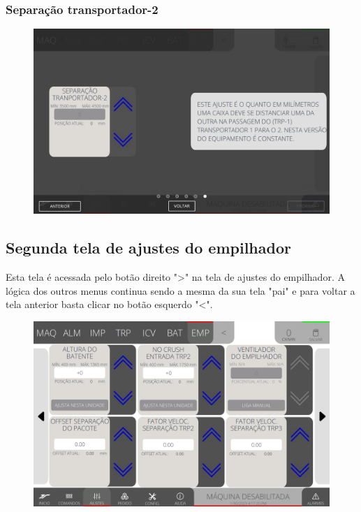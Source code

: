 \newpage
\thispagestyle{fancy}
\vspace*{40 pt}
\subsubsection{\small{Separação transportador-2}} \label{sec:telaAjustesEmpilhadorSeparacaoTransportador2}
\vspace*{\fill}
\begin{figure}[h]
    \centering
    \includegraphics[width=576 px,height=360 px]{src/imagesICV/08-stacker/settings/6.png}
\end{figure}
\vspace*{\fill}

\newpage
\thispagestyle{fancy}
\vspace*{40 pt}
\subsection{Segunda tela de ajustes do empilhador} \label{sec:telaAjustesEmpilhadorSegundaTela}
Esta tela é acessada pelo botão direito "\textgreater" na tela de ajustes do empilhador. A lógica dos outros menus continua sendo a mesma da sua tela "pai" e para voltar a tela anterior basta clicar no botão esquerdo "\textless{}".
\vspace*{\fill}
\begin{figure}[h]
    \centering
    \includegraphics[width=480 px,height=300 px]{src/imagesICV/08-stacker/settings/Tela-Principal-2.png}
\end{figure}
\vspace*{\fill}

